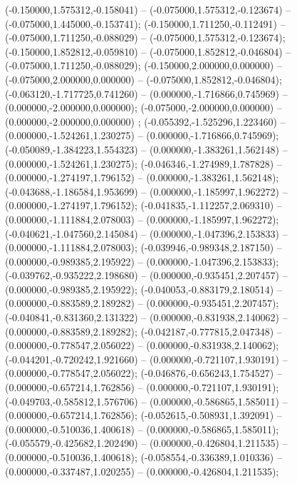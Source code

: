  (-0.150000,1.575312,-0.158041) -- (-0.075000,1.575312,-0.123674) -- (-0.075000,1.445000,-0.153741);
 (-0.150000,1.711250,-0.112491) -- (-0.075000,1.711250,-0.088029) -- (-0.075000,1.575312,-0.123674);
 (-0.150000,1.852812,-0.059810) -- (-0.075000,1.852812,-0.046804) -- (-0.075000,1.711250,-0.088029);
 (-0.150000,2.000000,0.000000) -- (-0.075000,2.000000,0.000000) -- (-0.075000,1.852812,-0.046804);
 (-0.063120,-1.717725,0.741260) -- (0.000000,-1.716866,0.745969) -- (0.000000,-2.000000,0.000000);
 (-0.075000,-2.000000,0.000000) -- (0.000000,-2.000000,0.000000) ;
 (-0.055392,-1.525296,1.223460) -- (0.000000,-1.524261,1.230275) -- (0.000000,-1.716866,0.745969);
 (-0.050089,-1.384223,1.554323) -- (0.000000,-1.383261,1.562148) -- (0.000000,-1.524261,1.230275);
 (-0.046346,-1.274989,1.787828) -- (0.000000,-1.274197,1.796152) -- (0.000000,-1.383261,1.562148);
 (-0.043688,-1.186584,1.953699) -- (0.000000,-1.185997,1.962272) -- (0.000000,-1.274197,1.796152);
 (-0.041835,-1.112257,2.069310) -- (0.000000,-1.111884,2.078003) -- (0.000000,-1.185997,1.962272);
 (-0.040621,-1.047560,2.145084) -- (0.000000,-1.047396,2.153833) -- (0.000000,-1.111884,2.078003);
 (-0.039946,-0.989348,2.187150) -- (0.000000,-0.989385,2.195922) -- (0.000000,-1.047396,2.153833);
 (-0.039762,-0.935222,2.198680) -- (0.000000,-0.935451,2.207457) -- (0.000000,-0.989385,2.195922);
 (-0.040053,-0.883179,2.180514) -- (0.000000,-0.883589,2.189282) -- (0.000000,-0.935451,2.207457);
 (-0.040841,-0.831360,2.131322) -- (0.000000,-0.831938,2.140062) -- (0.000000,-0.883589,2.189282);
 (-0.042187,-0.777815,2.047348) -- (0.000000,-0.778547,2.056022) -- (0.000000,-0.831938,2.140062);
 (-0.044201,-0.720242,1.921660) -- (0.000000,-0.721107,1.930191) -- (0.000000,-0.778547,2.056022);
 (-0.046876,-0.656243,1.754527) -- (0.000000,-0.657214,1.762856) -- (0.000000,-0.721107,1.930191);
 (-0.049703,-0.585812,1.576706) -- (0.000000,-0.586865,1.585011) -- (0.000000,-0.657214,1.762856);
 (-0.052615,-0.508931,1.392091) -- (0.000000,-0.510036,1.400618) -- (0.000000,-0.586865,1.585011);
 (-0.055579,-0.425682,1.202490) -- (0.000000,-0.426804,1.211535) -- (0.000000,-0.510036,1.400618);
 (-0.058554,-0.336389,1.010336) -- (0.000000,-0.337487,1.020255) -- (0.000000,-0.426804,1.211535);
